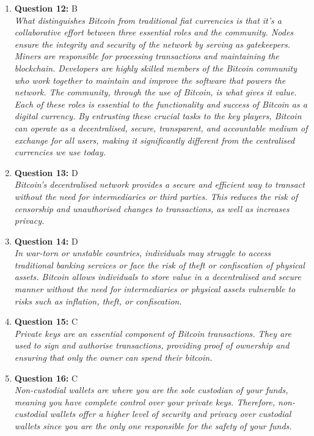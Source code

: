 \documentclass[12pt,a4paper]{article}
\begin{document}
\begin{enumerate}
\item \textbf{Question 12:} B
\\ \textit{What distinguishes Bitcoin from traditional fiat currencies is that it's a 
collaborative effort between three essential roles and the community.
Nodes ensure the integrity and security of the network by serving as gatekeepers.
Miners are responsible for processing transactions and maintaining the blockchain.
Developers are highly skilled members of the Bitcoin community who work together 
to maintain and improve the software that powers the network.
The community, through the use of Bitcoin, is what gives it value.
Each of these roles is essential to the functionality and success of Bitcoin as a 
digital currency. By entrusting these crucial tasks to the key players, Bitcoin can 
operate as a decentralised, secure, transparent, and accountable medium of exchange for 
all users, making it significantly different from the centralised currencies we use today.}

\item \textbf{Question 13:} D
\\ \textit{Bitcoin's decentralised network provides a secure and efficient way to 
transact without the need for intermediaries or third parties. This 
reduces the risk of censorship and unauthorised changes to transactions,
as well as increases privacy.}

\item \textbf{Question 14:} D
\\ \textit{In war-torn or unstable countries, individuals may struggle to 
access traditional banking services or face the risk of theft or 
confiscation of physical assets. Bitcoin allows individuals to store value 
in a decentralised and secure manner without the need for intermediaries 
or physical assets vulnerable to risks such as inflation, theft, or confiscation.}

\item \textbf{Question 15:} C
\\ \textit{Private keys are an essential component of Bitcoin transactions.
They are used to sign and authorise transactions, providing proof 
of ownership and ensuring that only the owner can spend their bitcoin.}

\item \textbf{Question 16:} C
\\ \textit{Non-custodial wallets are where you are the sole custodian of your funds,
meaning you have complete control over your private keys. Therefore,
non-custodial wallets offer a higher level of security and privacy 
over custodial wallets since you are the only one responsible for the safety of your funds.}


\end{enumerate}
\end{document}
